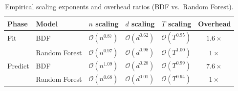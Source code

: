 \begin{table}[t]
\centering
\caption{Empirical scaling exponents and overhead ratios (BDF vs.\ Random Forest).}
\label{tab:complexity}
\begin{tabular}{llcccc}
\toprule
Phase & Model & $n$ scaling & $d$ scaling & $T$ scaling & Overhead \\
\midrule
Fit & BDF & $\mathcal{O}(n^{0.87})$ & $\mathcal{O}(d^{0.62})$ & $\mathcal{O}(T^{0.95})$ & $1.6\times$ \\
 & Random Forest & $\mathcal{O}(n^{0.97})$ & $\mathcal{O}(d^{0.98})$ & $\mathcal{O}(T^{1.00})$ & $1\times$ \\
\midrule
Predict & BDF & $\mathcal{O}(n^{1.09})$ & $\mathcal{O}(d^{0.28})$ & $\mathcal{O}(T^{0.99})$ & $7.6\times$ \\
 & Random Forest & $\mathcal{O}(n^{0.68})$ & $\mathcal{O}(d^{0.01})$ & $\mathcal{O}(T^{0.94})$ & $1\times$ \\
\bottomrule
\end{tabular}
\end{table}
